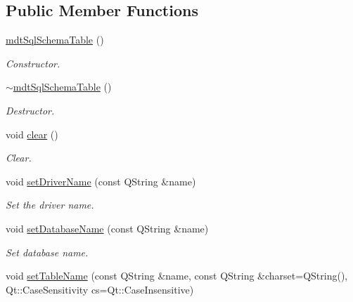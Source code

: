 \subsection*{Public Member Functions}
\begin{DoxyCompactItemize}
\item 
\hypertarget{classmdt_sql_schema_table_a0f4d89a81a175e51b664de84ad39de65}{
\hyperlink{classmdt_sql_schema_table_a0f4d89a81a175e51b664de84ad39de65}{mdtSqlSchemaTable} ()}
\label{classmdt_sql_schema_table_a0f4d89a81a175e51b664de84ad39de65}

\begin{DoxyCompactList}\small\item\em Constructor. \end{DoxyCompactList}\item 
\hypertarget{classmdt_sql_schema_table_a39be8d436117529ecdb881e0855e1403}{
\hyperlink{classmdt_sql_schema_table_a39be8d436117529ecdb881e0855e1403}{$\sim$mdtSqlSchemaTable} ()}
\label{classmdt_sql_schema_table_a39be8d436117529ecdb881e0855e1403}

\begin{DoxyCompactList}\small\item\em Destructor. \end{DoxyCompactList}\item 
\hypertarget{classmdt_sql_schema_table_a3ee39e0981fc152c6f811114b78068aa}{
void \hyperlink{classmdt_sql_schema_table_a3ee39e0981fc152c6f811114b78068aa}{clear} ()}
\label{classmdt_sql_schema_table_a3ee39e0981fc152c6f811114b78068aa}

\begin{DoxyCompactList}\small\item\em Clear. \end{DoxyCompactList}\item 
void \hyperlink{classmdt_sql_schema_table_a3518d03c95486589222610b69abe6ee8}{setDriverName} (const QString \&name)
\begin{DoxyCompactList}\small\item\em Set the driver name. \end{DoxyCompactList}\item 
\hypertarget{classmdt_sql_schema_table_aa9a99e27383cd6ba34231d5b2eb60dd8}{
void \hyperlink{classmdt_sql_schema_table_aa9a99e27383cd6ba34231d5b2eb60dd8}{setDatabaseName} (const QString \&name)}
\label{classmdt_sql_schema_table_aa9a99e27383cd6ba34231d5b2eb60dd8}

\begin{DoxyCompactList}\small\item\em Set database name. \end{DoxyCompactList}\item 
\hypertarget{classmdt_sql_schema_table_a36b5b28c64ad9cfa69a65e775fc33cbd}{
void \hyperlink{classmdt_sql_schema_table_a36b5b28c64ad9cfa69a65e775fc33cbd}{setTableName} (const QString \&name, const QString \&charset=QString(), Qt::CaseSensitivity cs=Qt::CaseInsensitive)}
\label{classmdt_sql_schema_table_a36b5b28c64ad9cfa69a65e775fc33cbd}


\end{DoxyCompactItemize}
